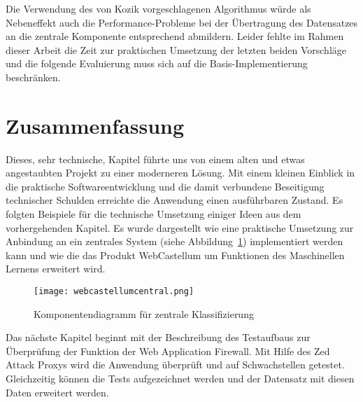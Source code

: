 Die Verwendung des von Kozik vorgeschlagenen Algorithmus würde als Nebeneffekt auch die Performance-Probleme bei der Übertragung des Datensatzes an die zentrale Komponente entsprechend abmildern. Leider fehlte im Rahmen dieser Arbeit die Zeit zur praktischen Umsetzung der letzten beiden Vorschläge und die folgende Evaluierung muss sich auf die Basis-Implementierung beschränken.



\clearpage
\section{Zusammenfassung}

Dieses, sehr technische, Kapitel führte uns von einem alten und etwas angestaubten Projekt zu einer moderneren Lösung. Mit einem kleinen Einblick in die praktische Softwareentwicklung und die damit verbundene Beseitigung technischer Schulden erreichte die Anwendung einen ausführbaren Zustand. Es folgten Beispiele für die technische Umsetzung einiger Ideen aus dem vorhergehenden Kapitel. Es wurde dargestellt wie eine praktische Umsetzung zur Anbindung an ein zentrales System (siehe Abbildung~\ref{fig:my_future}) implementiert werden kann und wie die das Produkt WebCastellum um Funktionen des Maschinellen Lernens erweitert wird. 

\begin{figure}[h]
    \centering
    \texttt{[image: webcastellumcentral.png]}
    \caption{Komponentendiagramm für zentrale Klassifizierung}
    \label{fig:my_future}
  \end{figure}

Das nächste Kapitel beginnt mit der Beschreibung des Testaufbaus zur Überprüfung der Funktion der Web Application Firewall. Mit Hilfe des Zed Attack Proxys wird die Anwendung überprüft und auf Schwachstellen getestet. Gleichzeitig können die Tests aufgezeichnet werden und der Datensatz mit diesen Daten erweitert werden.

